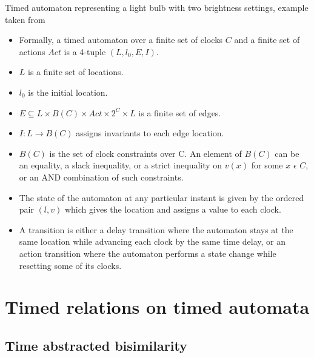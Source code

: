 \documentclass{article}
\begin{document}
Timed automaton representing a light bulb with two
brightness settings, example taken from \cite{aceto2007reactive}

\begin{itemize}
\item Formally, a timed automaton over a finite set of clocks $C$
  and a finite set of actions $Act$ is a 4-tuple $(L, l_{0}, E, I)$.
\item $L$ is a finite set of locations.
\item $l_{0}$ is the initial location.
\item $E \subseteq L \times B(C) \times Act \times 2^{C} \times L$
  is a finite set of edges.
\item $I: L \rightarrow B(C)$ assigns invariants to each edge
  location.
\item $B(C)$ is the set of clock constraints over C. An element of $B(C)$
  can be an equality, a slack inequality, or a strict inequality on
  $v(x)$ for some $x$ $\epsilon$ $C$, or
  an AND combination of such constraints.
\item The state of the automaton at any particular instant is given
  by the ordered pair $(l, v)$ which gives the location and assigns
  a value to each clock. 
\item A transition is either a delay transition where the automaton
  stays at the same location while advancing each clock by the same
  time delay, or an action transition where the automaton performs a
  state change while resetting some of its clocks.
\end{itemize}

\pagebreak

\section{Timed relations on timed automata}

\subsection{Time abstracted bisimilarity}
\end{document}
